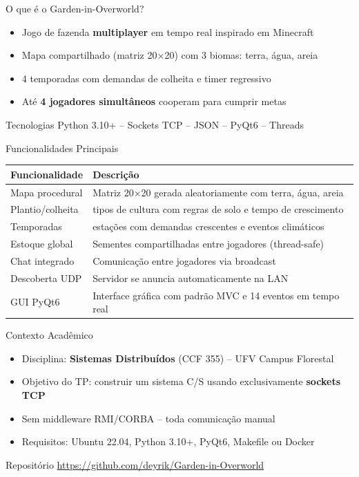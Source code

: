 \documentclass[aspectratio=169]{beamer}
\begin{document}
\begin{frame}{O que \'e o Garden-in-Overworld?}
  \begin{itemize}
    \item Jogo de fazenda \textbf{multiplayer} em tempo real inspirado em Minecraft
    \item Mapa compartilhado (matriz 20$\times$20) com 3 biomas: terra, \'agua, areia
    \item 4 temporadas com demandas de colheita e timer regressivo
    \item At\'e \textbf{4 jogadores simult\^aneos} cooperam para cumprir metas
  \end{itemize}
  \vfill
  \begin{exampleblock}{Tecnologias}
    Python 3.10+ -- Sockets TCP -- JSON -- PyQt6 -- Threads
  \end{exampleblock}
\end{frame}

\begin{frame}{Funcionalidades Principais}
  \footnotesize
  \begin{tabular}{>{\raggedright\arraybackslash}p{3.5cm}>{\raggedright\arraybackslash}p{9cm}}
    \toprule
    \textbf{Funcionalidade} & \textbf{Descri\c{c}\~ao} \\
    \midrule
    Mapa procedural & Matriz 20$\times$20 gerada aleatoriamente com terra, \'agua, areia \\
    Plantio/colheita & 6 tipos de cultura com regras de solo e tempo de crescimento \\
    Temporadas & 4 esta\c{c}\~oes com demandas crescentes e eventos clim\'aticos \\
    Estoque global & Sementes compartilhadas entre jogadores (thread-safe) \\
    Chat integrado & Comunica\c{c}\~ao entre jogadores via broadcast \\
    Descoberta UDP & Servidor se anuncia automaticamente na LAN \\
    GUI PyQt6 & Interface gr\'afica com padr\~ao MVC e 14 eventos em tempo real \\
    \bottomrule
  \end{tabular}
\end{frame}

\begin{frame}{Contexto Acad\^emico}
  \begin{itemize}
    \item Disciplina: \textbf{Sistemas Distribu\'idos} (CCF 355) -- UFV Campus Florestal
    \item Objetivo do TP: construir um sistema C/S usando exclusivamente \textbf{sockets TCP}
    \item Sem middleware RMI/CORBA -- toda comunica\c{c}\~ao manual
    \item Requisitos: Ubuntu 22.04, Python 3.10+, PyQt6, Makefile ou Docker
  \end{itemize}
  \vfill
  \begin{block}{Reposit\'orio}
    \url{https://github.com/deyrik/Garden-in-Overworld}
  \end{block}
\end{frame}
\end{document}
